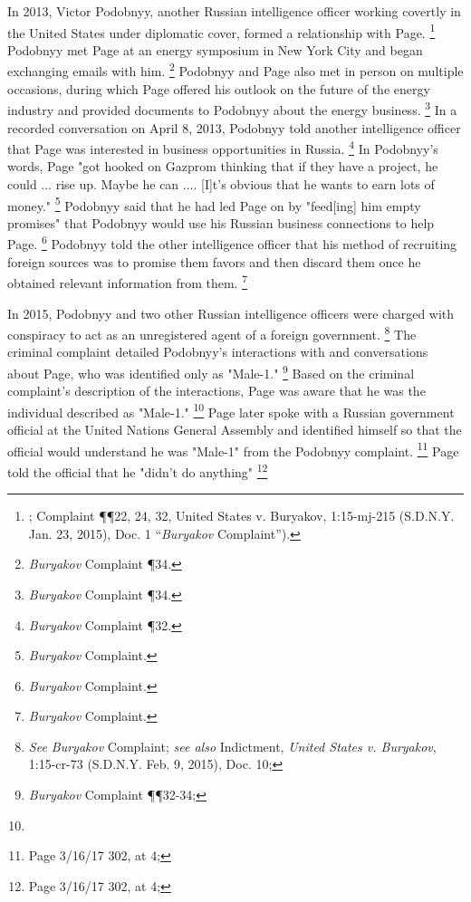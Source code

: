 In 2013, Victor Podobnyy, another Russian intelligence officer working covertly in the United States under diplomatic cover, formed a relationship with Page.%
\footnote{; Complaint \P\P 22, 24, 32, United States v. Buryakov, 1:15-mj-215 (S.D.N.Y. Jan. 23, 2015), Doc. 1 “\textit{Buryakov} Complaint”).}
Podobnyy met Page at an energy symposium in New York City and began exchanging emails with him.%
\footnote{\textit{Buryakov} Complaint \P 34.}
Podobnyy and Page also met in person on multiple occasions, during which Page offered his outlook on the future of the energy industry and provided documents to Podobnyy about the energy business. %
\footnote{\textit{Buryakov} Complaint \P 34.}
In a recorded conversation on April 8, 2013, Podobnyy told another intelligence officer that Page was interested in business opportunities in Russia.%
\footnote{\textit{Buryakov} Complaint \P 32.}
In Podobnyy's words, Page "got hooked on Gazprom thinking that if they have a project, he could ... rise up. Maybe he can .... [I]t's obvious that he wants to earn lots of money."%
\footnote{\textit{Buryakov} Complaint.}
Podobnyy said that he had led Page on by "feed[ing] him empty promises" that Podobnyy would use his Russian business connections to help Page.%
\footnote{\textit{Buryakov} Complaint.}
Podobnyy told the other intelligence officer that his method of recruiting foreign sources was to promise them favors and then discard them once he obtained relevant information from them.%
\footnote{\textit{Buryakov} Complaint.}

In 2015, Podobnyy and two other Russian intelligence officers were charged with conspiracy to act as an unregistered agent of a foreign government.%
\footnote{\textit{See Buryakov} Complaint;
\textit{see also} Indictment, \textit{United States v. Buryakov}, 1:15-cr-73 (S.D.N.Y. Feb. 9, 2015), Doc. 10;
}
The criminal complaint detailed Podobnyy's interactions with and conversations about Page, who was identified only as "Male-1."%
\footnote{\textit{Buryakov} Complaint \P\P 32-34; }
Based on the criminal complaint's description of the interactions, Page was aware that he was the individual described as "Male-1."%
\footnote{}
Page later spoke with a Russian government official at the United Nations General Assembly and identified himself so that the official would understand he was "Male-1" from the Podobnyy complaint. %
\footnote{Page 3/16/17 302, at 4; }
Page told the official that he "didn't do anything"
\footnote{Page 3/16/17 302, at 4; }

